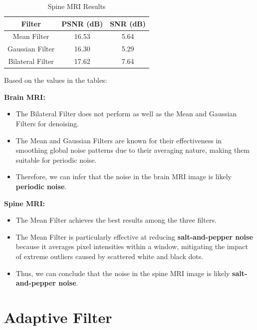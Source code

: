 \documentclass[hidelinks,12pt]{article}
\begin{document}
	\begin{table}[h!]
		\centering
		\begin{tabular}{|c|c|c|}
			\hline
			\textbf{Filter}       & \textbf{PSNR (dB)} & \textbf{SNR (dB)} \\
			\hline
			Mean Filter           & 16.53              & 5.64              \\
			Gaussian Filter       & 16.30              & 5.29              \\
			Bilateral Filter      & 17.62              & 7.64              \\
			\hline
		\end{tabular}
		\caption{Spine MRI Results}
	\end{table}
	
	\pagebreak
	
	 Based on the values in the tables:
	
		\textbf{Brain MRI:}
		\begin{itemize}
			\item The Bilateral Filter does not perform as well as the Mean and Gaussian Filters for denoising.
			\item The Mean and Gaussian Filters are known for their effectiveness in smoothing global noise patterns due to their averaging nature, making them suitable for periodic noise.
			\item Therefore, we can infer that the noise in the brain MRI image is likely \textbf{periodic noise}.
		\end{itemize}
		
		\textbf{Spine MRI:}
		\begin{itemize}
			\item The Mean Filter achieves the best results among the three filters.
			\item The Mean Filter is particularly effective at reducing \textbf{salt-and-pepper noise} because it averages pixel intensities within a window, mitigating the impact of extreme outliers caused by scattered white and black dots.
			\item Thus, we can conclude that the noise in the spine MRI image is likely \textbf{salt-and-pepper noise}.
		\end{itemize}
	
	\pagebreak
	
	\section{Adaptive Filter}
	
\end{document}
